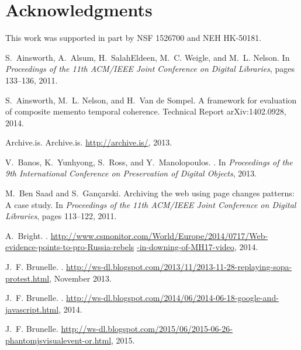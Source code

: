 \documentclass{sig-alternate}
\begin{document}
\section{Acknowledgments}
This work was supported in part by NSF 1526700 and NEH HK-50181.


%
%  
\begin{thebibliography}{10}

S.~Ainsworth, A.~Alsum, H.~SalahEldeen, M.~C. Weigle, and M.~L. Nelson.
\newblock In {\em {Proceedings of the 11th ACM/IEEE Joint Conference on Digital
  Libraries}}, pages 133--136, 2011.

S.~Ainsworth, M.~L. Nelson, and H.~{Van de Sompel}.
\newblock A framework for evaluation of composite memento temporal coherence.
\newblock Technical Report arXiv:1402.0928, 2014.

{Archive.is}.
\newblock Archive.is.
\newblock \url{http://archive.is/}, 2013.

V.~Banos, K.~Yunhyong, S.~Ross, and Y.~Manolopoulos.
.
\newblock In {\em Proceedings of the 9th International Conference on
  Preservation of Digital Objects}, 2013.

M.~{Ben Saad} and S.~Gançarski.
\newblock Archiving the web using page changes patterns: A case study.
\newblock In {\em {Proceedings of the 11th ACM/IEEE Joint Conference on Digital
  Libraries}}, pages 113--122, 2011.

A.~Bright.
.
\newblock
  \url{http://www.csmonitor.com/World/Europe/2014/0717/Web-evidence-points-to-pro-Russia-rebels}
  \url{-in-downing-of-MH17-video}, 2014.

J.~F. Brunelle.
.
\newblock
  \url{http://ws-dl.blogspot.com/2013/11/2013-11-28-replaying-sopa-protest.html},
  November 2013.

J.~F. Brunelle.
.
\newblock
  \url{http://ws-dl.blogspot.com/2014/06/2014-06-18-google-and-javascript.html},
  2014.

J.~F. Brunelle.
\newblock
  \url{http://ws-dl.blogspot.com/2015/06/2015-06-26-phantomjsvisualevent-or.html},
  2015.


\end{thebibliography}
\end{document}
